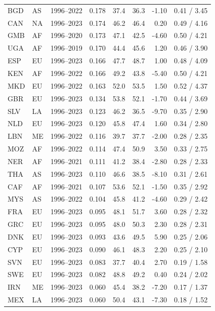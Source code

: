 \begin{tabular}{llrrrrrr}
BGD & AS & 1996--2022 & 0.178 & 37.4 & 36.3 & -1.10 & 0.41 / 3.45 \\
CAN & NA & 1996--2023 & 0.174 & 46.2 & 46.4 & 0.20 & 0.49 / 4.16 \\
GMB & AF & 1996--2020 & 0.173 & 47.1 & 42.5 & -4.60 & 0.50 / 4.21 \\
UGA & AF & 1996--2019 & 0.170 & 44.4 & 45.6 & 1.20 & 0.46 / 3.90 \\
ESP & EU & 1996--2023 & 0.166 & 47.7 & 48.7 & 1.00 & 0.48 / 4.09 \\
KEN & AF & 1996--2022 & 0.166 & 49.2 & 43.8 & -5.40 & 0.50 / 4.21 \\
MKD & EU & 1996--2022 & 0.163 & 52.0 & 53.5 & 1.50 & 0.52 / 4.37 \\
GBR & EU & 1996--2023 & 0.134 & 53.8 & 52.1 & -1.70 & 0.44 / 3.69 \\
SLV & LA & 1996--2023 & 0.123 & 46.2 & 36.5 & -9.70 & 0.35 / 2.90 \\
NLD & EU & 1996--2023 & 0.120 & 45.8 & 47.4 & 1.60 & 0.34 / 2.80 \\
LBN & ME & 1996--2022 & 0.116 & 39.7 & 37.7 & -2.00 & 0.28 / 2.35 \\
MOZ & AF & 1996--2022 & 0.114 & 47.4 & 50.9 & 3.50 & 0.33 / 2.75 \\
NER & AF & 1996--2021 & 0.111 & 41.2 & 38.4 & -2.80 & 0.28 / 2.33 \\
THA & AS & 1996--2023 & 0.110 & 46.6 & 38.5 & -8.10 & 0.31 / 2.61 \\
CAF & AF & 1996--2021 & 0.107 & 53.6 & 52.1 & -1.50 & 0.35 / 2.92 \\
MYS & AS & 1996--2022 & 0.104 & 45.8 & 41.2 & -4.60 & 0.29 / 2.42 \\
FRA & EU & 1996--2023 & 0.095 & 48.1 & 51.7 & 3.60 & 0.28 / 2.32 \\
GRC & EU & 1996--2023 & 0.095 & 48.0 & 50.3 & 2.30 & 0.28 / 2.31 \\
DNK & EU & 1996--2023 & 0.093 & 43.6 & 49.5 & 5.90 & 0.25 / 2.06 \\
CYP & EU & 1996--2023 & 0.090 & 46.1 & 48.3 & 2.20 & 0.25 / 2.10 \\
SVN & EU & 1996--2023 & 0.083 & 37.7 & 40.4 & 2.70 & 0.19 / 1.58 \\
SWE & EU & 1996--2023 & 0.082 & 48.8 & 49.2 & 0.40 & 0.24 / 2.02 \\
IRN & ME & 1996--2023 & 0.060 & 45.4 & 38.2 & -7.20 & 0.17 / 1.37 \\
MEX & LA & 1996--2023 & 0.060 & 50.4 & 43.1 & -7.30 & 0.18 / 1.52 \\

\end{tabular}
